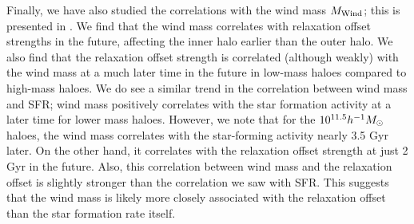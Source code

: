 
Finally, we have also studied the correlations with the wind mass $M_{\rm{Wind}}$; this is presented in . We find that the wind mass correlates with relaxation offset strengths in the future, affecting the inner halo earlier than the outer halo. We also find that the relaxation offset strength is correlated (although weakly) with the wind mass at a much later time in the future in low-mass haloes compared to high-mass haloes. We do see a similar trend in the correlation between wind mass and SFR; wind mass positively correlates with the star formation activity at a later time for lower mass haloes. However, we note that for the $10^{11.5}h^{-1}M_{\odot}$ haloes, the wind mass correlates with the star-forming activity nearly 3.5 Gyr later. On the other hand, it correlates with the relaxation offset strength at just 2 Gyr in the future. Also, this correlation between wind mass and the relaxation offset is slightly stronger than the correlation we saw with SFR. This suggests that the wind mass is likely more closely associated with the relaxation offset than the star formation rate itself.






